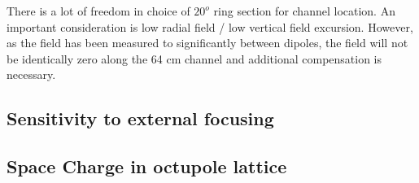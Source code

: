There is a lot of freedom in choice of $20^o$ ring section for channel location. An important consideration is low radial field / low vertical field excursion. However, as the field has been measured to significantly between dipoles, the field will not be identically zero along the 64 cm channel and additional compensation is necessary. 


\subsection{Sensitivity to external focusing}

\subsection{Space Charge in octupole lattice}


\begin{figure}[]
\centering
{}\label{fig:halo-rms-60muA}
\label{fig:halo-rms-pencil}
\caption{}
\label{fig:halo-rms}
\end{figure}

